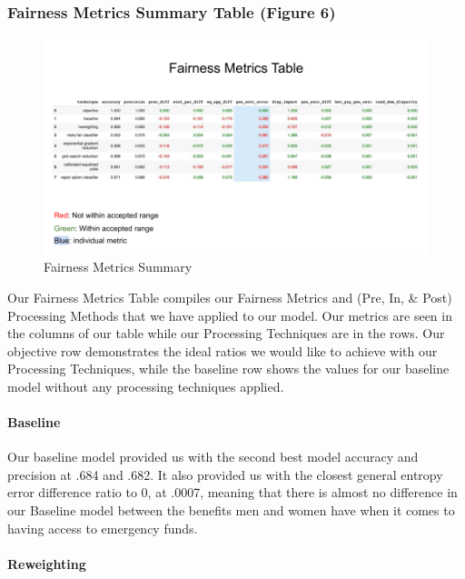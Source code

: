 \documentclass[water,article,submit,moreauthors,pdftex]{mdpi}
\begin{document}
\hypertarget{fairness-metrics-summary-table-figure-6}{%
\subsubsection{Fairness Metrics Summary Table (Figure
6)}\label{fairness-metrics-summary-table-figure-6}}

\begin{figure}
\centering
\includegraphics[width=\textwidth,height=0.4\textheight]{images/FairnessMetricsSummary.png}
\caption{Fairness Metrics Summary}
\end{figure}

Our Fairness Metrics Table compiles our Fairness Metrics and (Pre, In,
\& Post) Processing Methods that we have applied to our model. Our
metrics are seen in the columns of our table while our Processing
Techniques are in the rows. Our objective row demonstrates the ideal
ratios we would like to achieve with our Processing Techniques, while
the baseline row shows the values for our baseline model without any
processing techniques applied.

\hypertarget{baseline}{%
\paragraph{Baseline}\label{baseline}}

Our baseline model provided us with the second best model accuracy and
precision at .684 and .682. It also provided us with the closest general
entropy error difference ratio to 0, at .0007, meaning that there is
almost no difference in our Baseline model between the benefits men and
women have when it comes to having access to emergency funds.

\hypertarget{reweighting}{%
\paragraph{Reweighting}\label{reweighting}}
\end{document}
